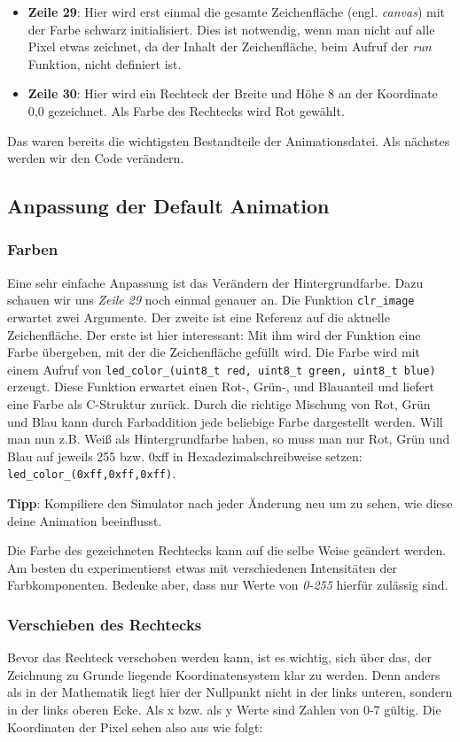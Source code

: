 \documentclass[10pt,a4paper]{article}
\begin{document}
\begin{itemize}
\item \textbf{Zeile 29}: Hier wird erst einmal die gesamte Zeichenfläche (engl. \textit{canvas}) mit der Farbe schwarz initialisiert. Dies ist notwendig, wenn man nicht auf alle Pixel etwas zeichnet, da der Inhalt der Zeichenfläche, beim Aufruf der \textit{run} Funktion, nicht definiert ist.

\item \textbf{Zeile 30}: Hier wird ein Rechteck der Breite und Höhe 8 an der Koordinate 0,0 gezeichnet. Als Farbe des Rechtecks wird Rot gewählt.
\end{itemize}

Das waren bereits die wichtigsten Bestandteile der Animationsdatei. Als nächstes werden wir den Code verändern.

\subsection{Anpassung der Default Animation}
\subsubsection{Farben}
Eine sehr einfache Anpassung ist das Verändern der Hintergrundfarbe. Dazu schauen wir uns \textit{Zeile 29} noch einmal genauer an. Die Funktion \lstinline|clr_image| erwartet zwei Argumente. Der zweite ist eine Referenz auf die aktuelle Zeichenfläche. Der erste ist hier interessant: Mit ihm wird der Funktion eine Farbe übergeben, mit der die Zeichenfläche gefüllt wird. Die Farbe wird mit einem Aufruf von \lstinline|led_color_(uint8_t red, uint8_t green, uint8_t blue)| erzeugt. Diese Funktion erwartet einen Rot-, Grün-, und Blauanteil und liefert eine Farbe als C-Struktur zurück. Durch die richtige Mischung von Rot, Grün und Blau kann durch Farbaddition jede beliebige Farbe dargestellt werden. Will man nun z.B. Weiß als Hintergrundfarbe haben, so muss man nur Rot, Grün und Blau auf jeweils 255 bzw. 0xff in Hexadezimalschreibweise setzen: \lstinline|led_color_(0xff,0xff,0xff)|.

\textbf{Tipp}: Kompiliere den Simulator nach jeder Änderung neu um zu sehen, wie diese deine Animation beeinflusst.

Die Farbe des gezeichneten Rechtecks kann auf die selbe Weise geändert werden. Am besten du experimentierst etwas mit verschiedenen Intensitäten der Farbkomponenten. Bedenke aber, dass nur Werte von \textit{0-255} hierfür zulässig sind.

\subsubsection{Verschieben des Rechtecks}
Bevor das Rechteck verschoben werden kann, ist es wichtig, sich über das, der Zeichnung zu Grunde liegende Koordinatensystem klar zu werden. Denn anders als in der Mathematik liegt hier der Nullpunkt nicht in der links unteren, sondern in der links oberen Ecke. Als x bzw. als y Werte sind Zahlen von 0-7 gültig. Die Koordinaten der Pixel sehen also aus wie folgt:
\end{document}
